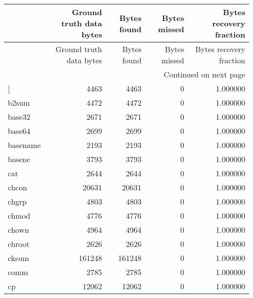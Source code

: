 \begin{longtable}{lrrrr}
\toprule
{} &  Ground truth data bytes &  Bytes found &  Bytes missed &  Bytes recovery fraction \\
\midrule
\endfirsthead

\toprule
{} &  Ground truth data bytes &  Bytes found &  Bytes missed &  Bytes recovery fraction \\
\midrule
\endhead
\midrule
\multicolumn{5}{r}{{Continued on next page}} \\
\midrule
\endfoot

\bottomrule
\endlastfoot
{[}         &                     4463 &         4463 &             0 &                 1.000000 \\
b2sum     &                     4472 &         4472 &             0 &                 1.000000 \\
base32    &                     2671 &         2671 &             0 &                 1.000000 \\
base64    &                     2699 &         2699 &             0 &                 1.000000 \\
basename  &                     2193 &         2193 &             0 &                 1.000000 \\
basenc    &                     3793 &         3793 &             0 &                 1.000000 \\
cat       &                     2644 &         2644 &             0 &                 1.000000 \\
chcon     &                    20631 &        20631 &             0 &                 1.000000 \\
chgrp     &                     4803 &         4803 &             0 &                 1.000000 \\
chmod     &                     4776 &         4776 &             0 &                 1.000000 \\
chown     &                     4964 &         4964 &             0 &                 1.000000 \\
chroot    &                     2626 &         2626 &             0 &                 1.000000 \\
cksum     &                   161248 &       161248 &             0 &                 1.000000 \\
comm      &                     2785 &         2785 &             0 &                 1.000000 \\
cp        &                    12062 &        12062 &             0 &                 1.000000 \\

\end{longtable}
